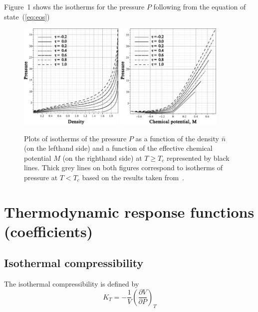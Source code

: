 \documentclass[12pt]{article}
\begin{document}
	Figure~1 shows the isotherms for the pressure $P$ following from the equation of state~(\ref{eq:eos})
	\begin{figure}[h!]
		\includegraphics[width=0.446\textwidth]{f1a1.pdf} 
		\includegraphics[width=0.45\textwidth]{f1b1.pdf} 
		\vskip-3mm\caption{Plots of isotherms of the pressure $P$ as a function of the density $\bar n$ (on the lefthand side) and a function of the effective chemical potential $M$ (on the righthand side) at $T \geq T_c$ represented by black lines. Thick grey lines on both figures correspond to isotherms of pressure at $T < T_c$ based on the results taken from~\cite{KozlovskiiDobush2020}. 
		}\label{fig1}
	\end{figure}
	
	\section{Thermodynamic response functions (coefficients)}
	
	\subsection{Isothermal compressibility}
	The isothermal compressibility is defined by
	\begin{equation}
		\label{def:isotherm_compres}
		K_T = -\frac{1}{V}\left(\frac{\partial V}{\partial P}\right)_T
	\end{equation}
	
\end{document}
